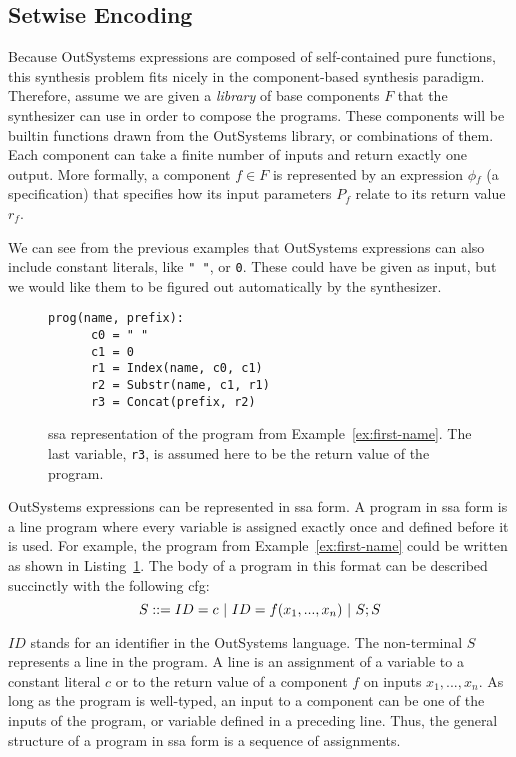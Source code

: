 \subsection{Setwise Encoding}
\label{sec:setwise-encoding}

Because OutSystems expressions are composed of self-contained pure functions,
this synthesis problem fits nicely in the component-based synthesis
paradigm. Therefore, assume we are given a \textit{library} of base components
$F$ that the synthesizer can use in order to compose the programs. These
components will be builtin functions drawn from the OutSystems library, or
combinations of them. Each component can take a finite number of inputs and
return exactly one output. More formally, a component $f \in F$ is represented
by an expression $\phi{}_f$ (a specification) that specifies how its input
parameters $P_f$ relate to its return value $r_f$.

We can see from the previous examples that OutSystems expressions can also
include constant literals, like \lstinline{" "}, or \lstinline{0}. These could
have be given as input, but we would like them to be figured out automatically
by the synthesizer.

\begin{figure}
  \begin{lstlisting}[frame=tlrb]
    prog(name, prefix):
      c0 = " "
      c1 = 0
      r1 = Index(name, c0, c1)
      r2 = Substr(name, c1, r1)
      r3 = Concat(prefix, r2)
  \end{lstlisting}
\caption{\gls{ssa} representation of the program from
    Example~\ref{ex:first-name}. The last variable, \lstinline{r3}, is assumed
    here to be the return value of the program.}
\label{fig:first-name-ssa}
\end{figure}

OutSystems expressions can be represented in \gls{ssa} form.
A program in \gls{ssa} form is a line program where every variable is assigned
exactly once and defined before it is used.
For example, the program from Example~\ref{ex:first-name} could be written
as shown in Listing~\ref{fig:first-name-ssa}.
The body of a program in this format can be described succinctly with the
following \gls{cfg}:
%
\[S ::= ID = c \ |\  ID = f(x_1, ..., x_n) \ |\  S;S\]

\noindent
$ID$ stands for an identifier in the OutSystems language. The non-terminal $S$
represents a line in the program. A line is an assignment of a variable to a
constant literal $c$ or to the return value of a component $f$ on inputs $x_1,
..., x_n$. As long as the program is well-typed, an input to a component can
be one of the inputs of the program, or variable defined in a preceding line.
Thus, the general structure of a program in \gls{ssa} form is a sequence of
assignments.

